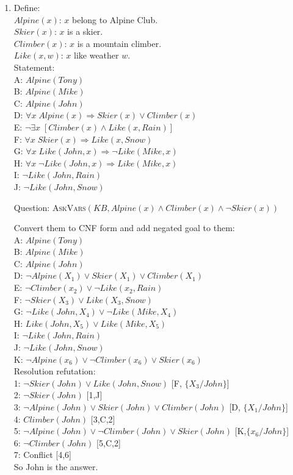 \documentclass{article}
\begin{document}
\begin{enumerate}
\item Define:\\
 $Alpine(x)$: $x$ belong to Alpine Club. \\
 $Skier(x)$: $x$ is a skier. \\
 $Climber(x)$: $x$ is a mountain climber. \\
 $Like(x,w)$: $x$ like weather $w$. \\

 Statement: \\
 A: $Alpine(Tony)$ \\
 B: $Alpine(Mike)$ \\
 C: $Alpine(John)$ \\
 D: $\forall x \; Alpine(x) \Rightarrow Skier(x)\lor Climber(x)$ \\
 E: $\neg\exists x \; [Climber(x) \land Like(x,Rain)]$ \\
 F: $\forall x \; Skier(x) \Rightarrow Like(x,Snow)$ \\
 G: $\forall x \; Like(John,x) \Rightarrow \neg Like(Mike,x)$ \\
 H: $\forall x \; \neg Like(John,x) \Rightarrow Like(Mike,x)$ \\
 I: $\neg Like(John,Rain)$ \\
 J: $\neg Like(John,Snow)$

 Question: \textsc{AskVars}$(KB, Alpine(x)\land Climber(x)\land \neg Skier(x))$

 Convert them to CNF form and add negated goal to them: \\
 A: $Alpine(Tony)$ \\
 B: $Alpine(Mike)$ \\
 C: $Alpine(John)$ \\
 D: $\neg Alpine(X_1) \lor Skier(X_1)\lor Climber(X_1)$ \\
 E: $\neg Climber(x_2) \lor \neg Like(x_2,Rain)$ \\
 F: $\neg Skier(X_3) \lor Like(X_3,Snow)$ \\
 G: $\neg Like(John,X_4) \lor \neg Like(Mike,X_4)$ \\
 H: $Like(John,X_5) \lor Like(Mike,X_5)$ \\
 I: $\neg Like(John,Rain)$ \\
 J: $\neg Like(John,Snow)$ \\
 K: $\neg Alpine(x_6)\lor \neg Climber(x_6)\lor Skier(x_6)$ \\

 Resolution refutation: \\
 1: $\neg Skier(John) \lor Like(John,Snow)$ [F, $\{X_3/John\}$] \\
 2: $\neg Skier(John)$ [1,J] \\
 3: $\neg Alpine(John) \lor Skier(John)\lor Climber(John)$ [D, $\{X_1/John\}$] \\
 4: $Climber(John)$ [3,C,2] \\
 5: $\neg Alpine(John)\lor \neg Climber(John)\lor Skier(John)$ [K,$\{x_6/John\}$] \\
 6: $\neg Climber(John)$ [5,C,2] \\
 7: Conflict [4,6] \\
 So John is the answer.


\end{enumerate}
\end{document}
